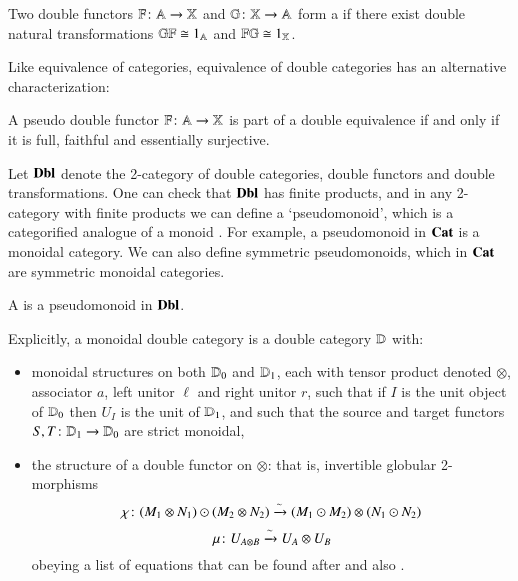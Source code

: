 \documentclass[reqno]{amsart}
\begin{document}
\begin{defn}
Two double functors $\mathbf{\mathbb F} \colon \mathbf{\mathbb A} \to \mathbf{\mathbb X}$ and $\mathbb{G} \colon \mathbf{\mathbb X} \to \mathbf{\mathbb A}$ form a  if there exist double natural transformations $\mathbb{G} \mathbf{\mathbb F} \cong 1_{\mathbf{\mathbb A}}$ and $\mathbf{\mathbb F} \mathbb{G} \cong 1_{\mathbf{\mathbb X}}$.
\end{defn}

Like equivalence of categories, equivalence of double categories has an alternative characterization:

\begin{thm}{\cite[Thm.\ 7.8]{Shulman2010}}
\label{ShulDubEquiv}
A pseudo double functor $\mathbf{\mathbb F} \colon \mathbf{\mathbb A} \to \mathbf{\mathbb X}$ is part of a double equivalence if and only if it is full, faithful and essentially surjective.
\end{thm}

Let $\mathbf{Dbl}$ denote the 2-category of double categories, double functors and double transformations. One can check that $\mathbf{Dbl}$ has finite products, and in any 2-category with finite products we can define a `pseudomonoid', which is a categorified analogue of a monoid \cite{DS}. For example, a pseudomonoid in $\mathbf{Cat}$ is a monoidal category.   We can also define symmetric pseudomonoids, which in $\mathbf{Cat}$ are symmetric monoidal categories.

\begin{defn}
\label{defn:monoidal_double_category}
A  is a pseudomonoid in $\mathbf{Dbl}$. 
\end{defn} 
\noindent
Explicitly, a monoidal double category is a double category $\mathbf{\mathbb D}$ with:
\begin{itemize}
\item monoidal structures on both $\mathbf{\mathbb D}_0$ and $\mathbf{\mathbb D}_1$, each with tensor product denoted $\otimes$, associator $a$, left unitor $\ell$ and right unitor $r$, such that if $I$ is the unit object of $\mathbf{\mathbb D}_0$ then $U_I$ is the unit of $\mathbf{\mathbb D}_1$, and such that the source and target functors $S,T \colon \mathbf{\mathbb D}_1 \to \mathbf{\mathbb D}_0$ are strict monoidal, 
\item the structure of a double functor on $\otimes$:
that is, invertible globular 2-morphisms
\[ \chi \colon (M_1\otimes N_1)\odot (M_2\otimes N_2) \xrightarrow{\sim}
(M_1\odot M_2)\otimes (N_1\odot N_2)\]
\[ \mu \colon U_{A\otimes B} \xrightarrow{\sim} U_A \otimes U_B\]
obeying a list of equations that can be found after \cite[Definition 2.10]{HS} and also \cite[Definition A.5]{BC}.
\end{itemize}
\end{document}
